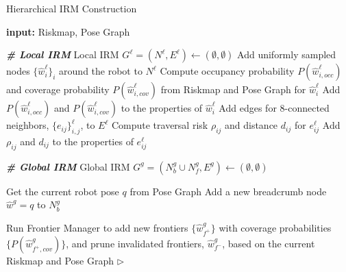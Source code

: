 \documentclass[letterpaper]{article} %
\begin{document}
\begin{algorithm}[t!]
{\fontsize{8.5pt}{9.8pt}\selectfont
\caption{Hierarchical IRM Construction}
\label{alg:IRMs}
\begin{algorithmic}
  \STATE \textbf{input:} Riskmap, Pose Graph %

  \vspace{3pt}
  \STATE \textbf{\textit{\# Local IRM}}
  \STATE Local IRM $G^\ell = (N^\ell, E^\ell) \gets (\emptyset, \emptyset)$
  \STATE Add uniformly sampled nodes $\{\hat{w}^\ell_i\}_i$ around the robot to $N^\ell$
    \STATE Compute occupancy probability $P(\hat{w}^\ell_{i,occ})$ and coverage probability $P(\hat{w}^\ell_{i,cov})$ from Riskmap and Pose Graph for $\hat{w}^\ell_i$
    \STATE Add $P(\hat{w}^\ell_{i,occ})$ and $P(\hat{w}^\ell_{i,cov})$ to the properties of $\hat{w}^\ell_i$
  \ENDFOR
  \STATE Add edges for 8-connected neighbors, $\{e_{ij}\}^\ell_{i,j}$, to $E^\ell$
    \STATE Compute traversal risk $\rho_{ij}$ and distance $d_{ij}$ for $e^\ell_{ij}$
    \STATE Add $\rho_{ij}$ and $d_{ij}$ to the properties of $e^\ell_{ij}$
  \ENDFOR

  \vspace{3pt}
  \STATE \textbf{\textit{\# Global IRM}}
    \STATE Global IRM $G^g = (N^g_b \cup N^g_f, E^g) \gets (\emptyset, \emptyset)$
  \ENDIF
  
  \STATE Get the current robot pose $q$ from Pose Graph
    \STATE Add a new breadcrumb node $\hat{w}^g = q$ to $N^g_b$
  \ENDIF


  \STATE Run Frontier Manager to add new frontiers $\{\hat{w}^g_{f^+}\}$ with coverage probabilities $\{P(\hat{w}^g_{f^+,cov})\}$, and prune invalidated frontiers, $\hat{w}^g_{f^-}$, based on the current Riskmap and Pose Graph
  \STATE \hspace{4.5cm} $\triangleright$ \cite{keidar2012robot}


\end{algorithmic}}
\end{algorithm}
\end{document}
